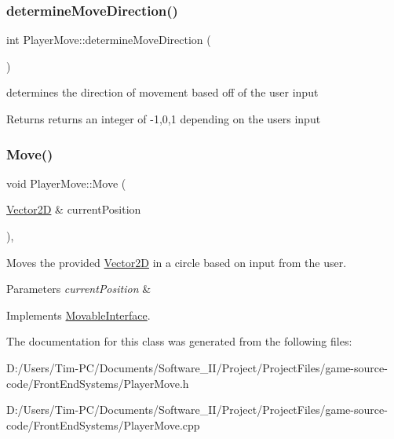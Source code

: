 \subsubsection{\texorpdfstring{determine\+Move\+Direction()}{determineMoveDirection()}}
{\footnotesize\ttfamily int Player\+Move\+::determine\+Move\+Direction (\begin{DoxyParamCaption}{ }\end{DoxyParamCaption})\hspace{0.3cm}{\ttfamily [private]}}



determines the direction of movement based off of the user input 

\begin{DoxyReturn}{Returns}
returns an integer of -\/1,0,1 depending on the users input 
\end{DoxyReturn}
\mbox{\label{class_player_move_a1c39885d4126c63441250eae23ac718a}} 
\subsubsection{\texorpdfstring{Move()}{Move()}}
{\footnotesize\ttfamily void Player\+Move\+::\+Move (\begin{DoxyParamCaption}\item[{\hyperlink{class_vector2_d}{Vector2D} \&}]{current\+Position }\end{DoxyParamCaption})\hspace{0.3cm}{\ttfamily [override]}, {\ttfamily [virtual]}}



Moves the provided \hyperlink{class_vector2_d}{Vector2D} in a circle based on input from the user. 


\begin{DoxyParams}{Parameters}
{\em current\+Position} & \\
\hline
\end{DoxyParams}


Implements \hyperlink{class_movable_interface_a899cc1c78eacbee13b906c6770e7f025}{Movable\+Interface}.



The documentation for this class was generated from the following files\+:\begin{DoxyCompactItemize}
\item 
D\+:/\+Users/\+Tim-\/\+P\+C/\+Documents/\+Software\+\_\+\+I\+I/\+Project/\+Project\+Files/game-\/source-\/code/\+Front\+End\+Systems/Player\+Move.\+h\item 
D\+:/\+Users/\+Tim-\/\+P\+C/\+Documents/\+Software\+\_\+\+I\+I/\+Project/\+Project\+Files/game-\/source-\/code/\+Front\+End\+Systems/Player\+Move.\+cpp\end{DoxyCompactItemize}
